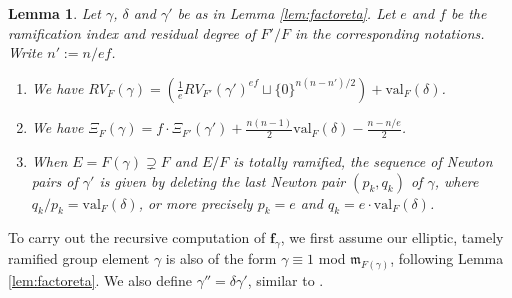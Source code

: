 \documentclass{amsart}
\numberwithin{equation}{section}
\newtheorem{lemma}{Lemma}[section]
\theoremstyle{definition}
\def\val{\mathrm{val}}
\newcommand{\fgamma}{\mathbf{f}_{\gamma}}
\newcommand{\fixme}[1]{{{\color{blue}{[#1]}}}}
\begin{document}
\begin{lemma}\label{lem:reductionnumerics} Let $\gamma$, $\delta$ and $\gamma'$ be as in Lemma \ref{lem:factoreta}. Let $e$ and $f$ be the ramification index and residual degree of $F'/F$ in the corresponding notations. Write $n':=n/ef$.
\begin{enumerate}
    \item We have $RV_F(\gamma)=(\frac{1}{e}RV_{F'}(\gamma')^{ef}\sqcup\{0\}^{n(n-n')/2})+\val_F(\delta)$. 
    \item We have $\Xi_F(\gamma)=f\cdot\Xi_{F'}(\gamma')+\frac{n(n-1)}{2}\val_F(\delta)-\frac{n-n/e}{2}$. 
    \item When $E=F(\gamma)\supsetneq F$ and $E/F$ is totally ramified, the sequence of Newton pairs of $\gamma'$ is given by deleting the last Newton pair $(p_k,q_k)$ of $\gamma$, where $q_k/p_k=\val_F(\delta)$, or more precisely $p_k=e$ and $q_k=e\cdot \val_F(\delta)$.
\end{enumerate}
\end{lemma}

To carry out the recursive computation of $\fgamma$, we first assume our elliptic, tamely ramified group element $\gamma$ is also of the form $\gamma\equiv 1$ mod $\mathfrak{m}_{F(\gamma)}$, following Lemma \ref{lem:factoreta}. %
We also define $\gamma''=\delta\gamma'$, similar to \cite[VII 4.]{W2}.
\end{document}
